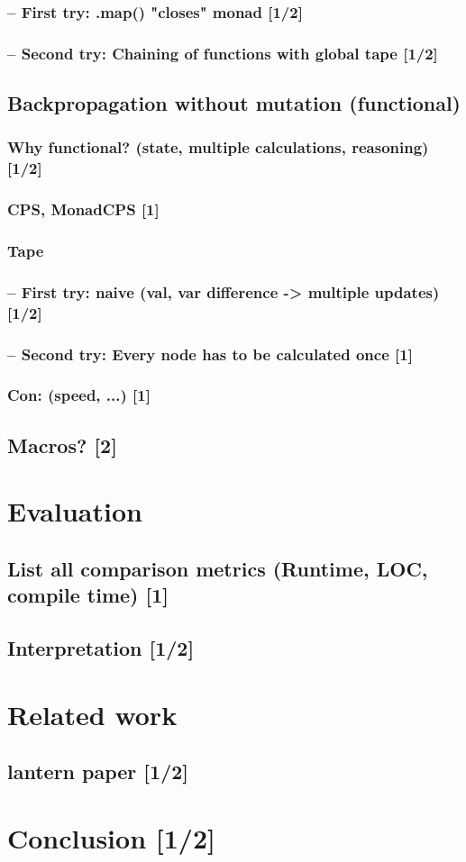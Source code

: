 \documentclass[
	english,
	class=report,custommargins=true,marginpar=false,
	accentcolor=9c,%
	thesis={type=bachelor},%
	fontsize=11pt,%
]{tudapub}
\begin{document}
			\subsection{ -- First try: .map() "closes" monad [1/2] }
			\subsection{ -- Second try: Chaining of functions with global tape [1/2]}

	\section{Backpropagation without mutation (functional)}
		\subsection{Why functional? (state, multiple calculations, reasoning) [1/2]}
		\subsection{CPS, MonadCPS [1]}
		\subsection{Tape}
			\subsection{ -- First try: naive (val, var difference -> multiple updates) [1/2]}
			\subsection{ -- Second try: Every node has to be calculated once [1]}
		\subsection{Con: (speed, ...) [1]}

    \section{Macros? [2]}


\chapter{Evaluation}
	\section{List all comparison metrics (Runtime, LOC, compile time) [1]}
	\section{Interpretation [1/2]}
\chapter{Related work}
	\section{lantern paper [1/2]}

\chapter{Conclusion [1/2]}



\printbibliography
\end{document}
